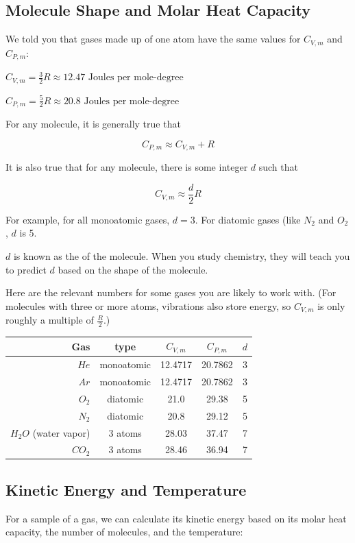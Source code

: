 \subsection{Molecule Shape and Molar Heat Capacity}

We told you that gases made up of one atom have the same values for $C_{V,m}$ and $C_{P,m}$:

$C_{V,m} = \frac{3}{2}R \approx 12.47 \text{ Joules per mole-degree}$

$C_{P,m} = \frac{5}{2}R \approx 20.8 \text{ Joules per mole-degree}$

For any molecule, it is generally true that 

$$C_{P,m} \approx C_{V,m} + R$$

It is also true that for any molecule, there is some integer $d$ such that

$$C_{V, m} \approx \frac{d}{2}R$$

For example, for all monoatomic gases, $d = 3$. For diatomic gases (like $N_2$ and $O_2$, $d$ is 5.

$d$ is known as the  of the molecule. When you study chemistry, they will teach you to predict $d$ based on the shape of the molecule. 

Here are the relevant numbers for some gases you are likely to work with. (For molecules with three or more atoms, vibrations also store energy, so $C_{V,m}$ is only roughly a multiple of $\frac{R}{2}$.)

\begin{tabular}{r|c|c| c| c}
Gas & type & $C_{V,m}$ & $C_{P,m}$ & $d$\\
\hline
$He$ & monoatomic & 12.4717 & 20.7862 & 3 \\
$Ar$ & monoatomic & 12.4717 & 20.7862 & 3 \\
$O_2$ & diatomic & 21.0 & 29.38 & 5\\
$N_2$ & diatomic & 20.8 & 29.12 & 5\\
$H_2O$ (water vapor) & 3 atoms & 28.03 & 37.47 & 7 \\
$CO_2$ & 3 atoms & 28.46 & 36.94 & 7\\
\end{tabular}

\subsection{Kinetic Energy and Temperature}

For a sample of a gas, we can calculate its kinetic energy based on its molar heat capacity, the number of molecules, and the temperature:

